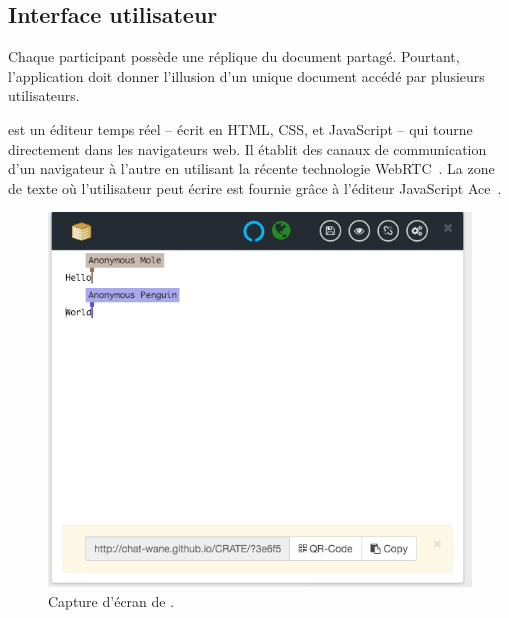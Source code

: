 \subsection{Interface utilisateur}

Chaque participant possède une réplique du document partagé. Pourtant,
l'application doit donner l'illusion d'un unique document accédé par plusieurs
utilisateurs.

\CRATE est un éditeur temps réel -- écrit en HTML, CSS, et JavaScript -- qui
tourne directement dans les navigateurs web. Il établit des canaux de
communication d'un navigateur à l'autre en utilisant la récente technologie
WebRTC~\cite{webrtc}. La zone de texte où l'utilisateur peut écrire est fournie
grâce à l'éditeur JavaScript Ace~\cite{ace}.



\begin{figure}
  \begin{center}
    \includegraphics[scale=0.6]{img/editor/cratescreenshot.png}
    \caption[Capture d'écran de \CRATE]
    {\label{editor:img:screenshot}Capture d'écran de \CRATE.}
  \end{center}
\end{figure}

